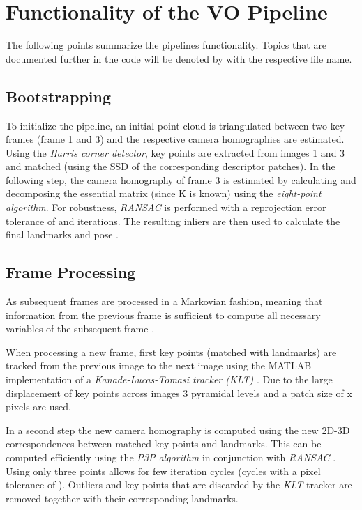 \chapter{Functionality of the VO Pipeline}
The following points summarize the pipelines functionality. 
Topics that are documented further in the code will be denoted by  with the respective file name.

\section{Bootstrapping}
To initialize the pipeline, an initial point cloud is triangulated between two key frames (frame 1 and 3) and the respective camera homographies are estimated. 
Using the \emph{Harris corner detector}, key points are extracted from images 1 and 3 and matched (using the SSD of the corresponding descriptor patches).
In the following step, the camera homography of frame 3 is estimated by calculating and decomposing the essential matrix (since K is known) using the \emph{eight-point algorithm}. 
For robustness, \emph{RANSAC} is performed with a reprojection error tolerance of \ransacPixelTolerance and \ransacNumIterations iterations. 
The resulting inliers are then used to calculate the final landmarks and pose .      

\section{Frame Processing}
As subsequent frames are processed in a Markovian fashion, meaning that information from the previous frame is sufficient to compute all necessary variables of the subsequent frame . \par
When processing a new frame, first key points (matched with landmarks) are tracked from the previous image to the next image using the MATLAB implementation of a \emph{Kanade-Lucas-Tomasi tracker (KLT)} . 
Due to the large displacement of key points across images 3 pyramidal levels and a patch size of \trackerBlocksize x \trackerBlocksize pixels are used. \par
In a second step the new camera homography is computed using the new 2D-3D correspondences between matched key points and landmarks. 
This can be computed efficiently using the \emph{P3P algorithm} in conjunction with \emph{RANSAC} . 
Using only three points allows for few iteration cycles (\ransacNumIterations cycles with a pixel tolerance of \ransacPixelTolerance). 
Outliers and key points that are discarded by the \emph{KLT} tracker are removed together with their corresponding landmarks.\par

